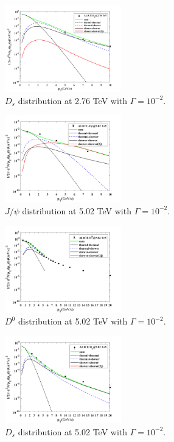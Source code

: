 \documentclass[twocolumn,aps,superscriptaddress,nofootinbib,floatfix]{revtex4}
\begin{document}
\begin{figure}[H]
	\includegraphics[width=0.45\textwidth]{Ds276_230205.png}
	\caption{$D_s$ distribution at 2.76 TeV with $\Gamma=10^{-2}$. }
	\label{fig54}
\end{figure}
\begin{figure}[H]
	\includegraphics[width=0.45\textwidth]{Jpsi502_230213.png}
	\caption{$J/\psi$ distribution at 5.02 TeV with $\Gamma=10^{-2}$. }
	\label{fig55}
\end{figure}
\begin{figure}[H]
	\includegraphics[width=0.45\textwidth]{D0502_230220.png}
	\caption{$D^0$ distribution at 5.02 TeV with $\Gamma=10^{-2}$. }
	\label{fig56}
\end{figure}
\begin{figure}[H]
	\includegraphics[width=0.45\textwidth]{Ds502_230220.png}
	\caption{$D_s$ distribution at 5.02 TeV with $\Gamma=10^{-2}$. }
	\label{fig57}
\end{figure}
\end{document}
